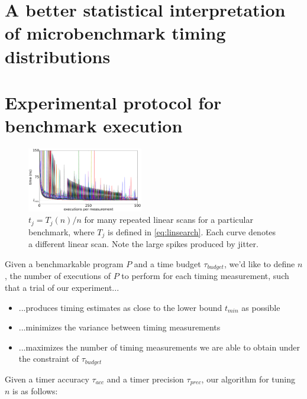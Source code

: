 \documentclass[conference]{IEEEtran}
\begin{document}

\label{sec:stats}
\section{A better statistical interpretation of microbenchmark timing distributions}

\label{sec:protocol}
\section{Experimental protocol for benchmark execution}

\begin{figure}
\centering
\includegraphics[width=0.45\textwidth]{figures/fig2/linear_scan_branchsum}
\caption{$t_j = T_j(n)/n$ for many repeated linear scans for a particular benchmark,
         where $T_j$ is defined in \eqref{eq:linsearch}. Each curve denotes a different
         linear scan. Note the large spikes produced by jitter.}
\label{fig:scaling}
\end{figure}

Given a benchmarkable program $P$ and a time budget $\tau_{budget}$, we'd like to define
$n$, the number of executions of $P$ to perform for each timing measurement, such that a
trial of our experiment...

\begin{itemize}
    \item ...produces timing estimates as close to the lower bound $t_{min}$ as possible
    \item ...minimizes the variance between timing measurements
    \item ...maximizes the number of timing measurements we are able to obtain under the
    constraint of $\tau_{budget}$
\end{itemize}

Given a timer accuracy $\tau_{acc}$ and a timer precision $\tau_{prec}$, our algorithm for
tuning $n$ is as follows:
\end{document}

